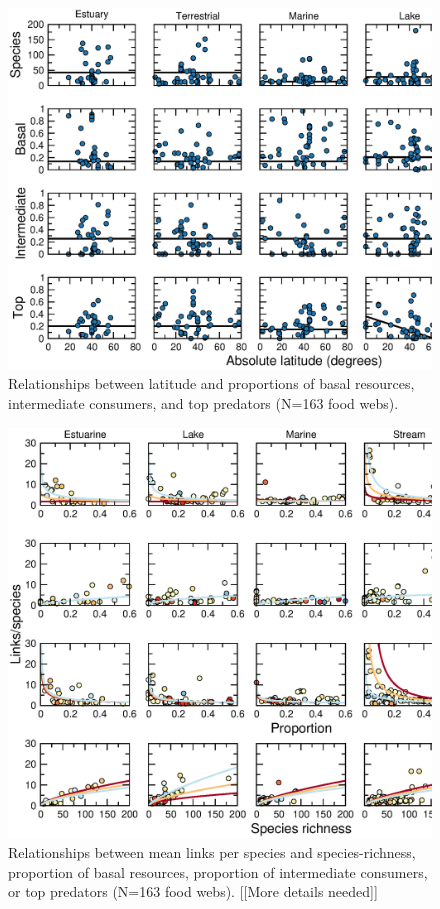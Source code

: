 \documentclass[12pt]{article}
\begin{document}
\begin{figure}[!h]
\label{TLs_v_lat}
\includegraphics[width=.9\textwidth]{Figures/by_TL/properties_vs_lat/proportions/nonts_TLvlat.eps}
\caption{Relationships between latitude and proportions of basal resources, intermediate consumers, and top predators (N=163 food webs). }
\end{figure}


\begin{figure}[!h]
\label{LS}
\includegraphics[width=.9\textwidth]{Figures/by_TL/scaling_with_S/proportions/LS_nonts.eps}
\caption{Relationships between mean links per species and species-richness, proportion of basal resources, proportion of intermediate consumers, or top predators (N=163 food webs). [[More details needed]]}
\end{figure}
\end{document}
